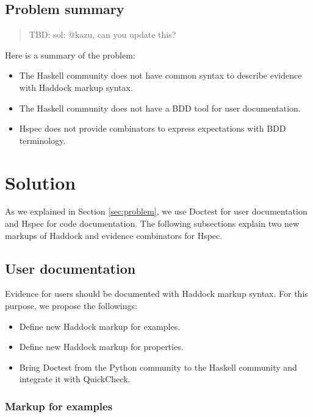 \documentclass[preprint]{sigplanconf}
\begin{document}
\subsection{Problem summary}


\begin{quote}
    TBD: sol: @kazu, can you update this?
\end{quote}

Here is a summary of the problem:

\begin{itemize}
\item
    The Haskell community does not have common syntax to describe
    evidence with Haddock markup syntax.
\item
    The Haskell community does not have a BDD tool for user documentation.
\item
    Hspec does not provide combinators to express expectations with
    BDD terminology.
\end{itemize}

\section{Solution}

As we explained in Section \ref{sec:problem},
we use Doctest for user documentation and Hspec for code documentation.
The following subsections explain two new markups of Haddock
and evidence combinators for Hspec.

\subsection{User documentation}
\label{sec:user-doc}



Evidence for users should be documented with Haddock markup syntax.
For this purpose, we propose the followings:

\begin{itemize}
\item Define new Haddock markup for examples.
\item Define new Haddock markup for properties.
\item Bring Doctest from the Python community to the Haskell
community and integrate it with QuickCheck.
\end{itemize}

\subsubsection{Markup for examples}
\end{document}
